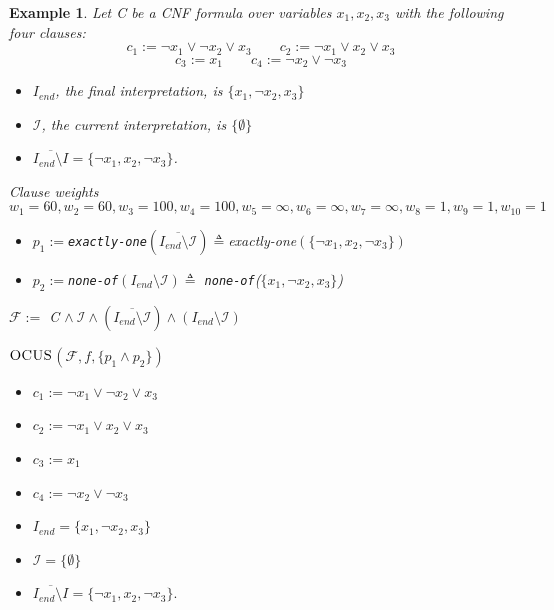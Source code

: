 \documentclass[twoside,11pt]{article}
\newcommand\m[1]{\mathcal{#1}}
\newtheorem{example}[ex]{Example}
\newcommand\Iend{\ensuremath{I_\mathit{end} }\xspace}
\newcommand\formula{\ensuremath{\m{F} }\xspace}
\newcommand\mm[1]{\ensuremath{#1}\xspace}
\newcommand\call[1]{\mm{\textsc{#1}}}
\newcommand\comus{\mm{\call{OCUS}}}
\begin{document}
\begin{example}
Let \emph{C} be a CNF formula over variables $x_1, x_2, x_3$ with the following four clauses:
\[ c_1 := \lnot x_1 \vee \lnot x_2 \vee x_3 \qquad  c_2 := \lnot x_1 \vee  x_2 \vee x_3\] \[  c_3 := x_1 \qquad c_4 := \lnot x_2 \vee \lnot x_3 \]
		
\begin{itemize}
	\item $\Iend$, the final interpretation, is $\{x_1, \lnot x_2,  x_3\}$
	\item $\m{I}$, the current interpretation, is $\{ \emptyset \}$
	\item $\overline{\Iend\setminus I} =  \{\lnot x_1, x_2, \lnot x_3\}$.
\end{itemize}
		
Clause weights \[w_1 = 60, w_2=60, w_3=100, w_4=100, w_5=\infty, w_6=\infty, w_7=\infty, w_8=1, w_9=1, w_{10}=1\]

\begin{itemize}                                      
\item $p_1 := $\texttt{exactly-one}$(\overline{\Iend\setminus \m{I}}) \triangleq $\textit{exactly-one$(\{\lnot x_1, x_2, \lnot x_3 \})$}
\item $p_2 := $\texttt{none-of}$(\Iend\setminus \m{I}) \triangleq $ \texttt{none-of}($\{x_1, \lnot x_2,  x_3\}$)
\end{itemize}


\begin{center}
$\formula :=  $ \emph{C} $ \wedge\  \m{I} \wedge (\overline{\Iend\setminus \m{I}}) \wedge (\Iend\setminus \m{I})$\\
\end{center} 
\begin{center}
\comus$(\formula, f,  \{ p_1 \wedge p_2\})$
\end{center} 
\end{example}


\clearpage
\begin{itemize}
\item $c_1 := \lnot x_1 \vee \lnot x_2 \vee x_3$
\item $c_2 := \lnot x_1 \vee  x_2 \vee x_3$
\item $c_3 := x_1$
\item $c_4 := \lnot x_2 \vee \lnot x_3$
	\item $\Iend = \{x_1 , \lnot x_2 , x_3\}$
	\item $\m{I} = \{ \emptyset \}$
	\item $\overline{\Iend\setminus I} =  \{\lnot x_1, x_2, \lnot x_3\}$.
\end{itemize}
		
\end{document}
